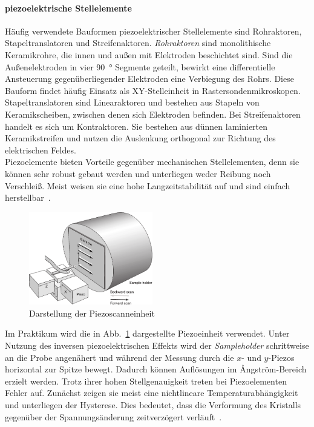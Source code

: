 \documentclass[a4paper,twoside,final]{article}
\begin{document}
\paragraph{piezoelektrische Stellelemente}
Häufig verwendete Bauformen piezoelektrischer Stellelemente sind Rohraktoren, Stapeltranslatoren und Streifenaktoren.
\textit{Rohraktoren} sind monolithische Keramikrohre, die innen und außen mit Elektroden beschichtet sind. Sind die Außenelektroden in vier \SI{90}{\degree} Segmente geteilt,  bewirkt eine differentielle Ansteuerung gegenüberliegender Elektroden eine Verbiegung des Rohrs. Diese Bauform findet häufig Einsatz als XY-Stelleinheit in Rastersondenmikroskopen.
Stapeltranslatoren sind Linearaktoren und bestehen aus Stapeln von Keramikscheiben, zwischen denen sich Elektroden befinden. Bei Streifenaktoren handelt es sich um Kontraktoren. Sie bestehen aus dünnen laminierten Keramikstreifen und nutzen die Auslenkung orthogonal zur Richtung des elektrischen Feldes.\\
Piezoelemente bieten Vorteile gegenüber mechanischen Stellelementen, denn sie können sehr robust gebaut werden und unterliegen weder Reibung noch Verschleiß. Meist weisen sie eine hohe Langzeitstabilität auf und sind einfach herstellbar~\cite{Versuchsanleitung}.
\newpage
\begin{figure}
  \centering
  \vspace{-3mm}
  \includegraphics[width=5.4cm]{Bilder/Piezoscanner.pdf}
  \caption{Darstellung der Piezoscanneinheit~\cite{Nanosurf}}
  \label{fig:Piezo}
\end{figure}
Im Praktikum wird die in Abb.~\ref{fig:Piezo} dargestellte Piezoeinheit verwendet. Unter Nutzung des inversen piezoelektrischen Effekts wird der \textit{Sampleholder} schrittweise an die Probe angenähert und während der Messung durch die $x$- und $y$-Piezos horizontal zur Spitze bewegt. Dadurch können Auflösungen im Ångström-Bereich erzielt werden.
Trotz ihrer hohen Stellgenauigkeit treten bei Piezoelementen Fehler auf. Zunächst zeigen sie meist eine nichtlineare Temperaturabhängigkeit und unterliegen der Hysterese. Dies bedeutet, dass die Verformung des Kristalls gegenüber der Spannungsänderung zeitverzögert verläuft~\cite{Versuchsanleitung}.
\end{document}
